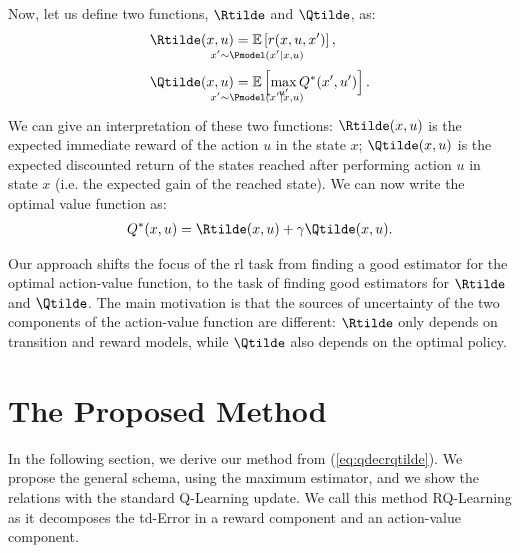 Now, let us define two functions, $\Rtilde$ and $\Qtilde$, as:
\begin{align}
 \Rtilde(x,u)&=\underset{\strut\mathclap{x'\sim \Pmodel(x'|x,u)}}{\mathbb{E}}\left[ r(x,u,x')\right], \nonumber\ \\
 \Qtilde(x,u)&=\underset{\strut\mathclap{x'\sim \Pmodel(x'|x,u)}}{\mathbb{E}}\left[\max_{u'} Q^*(x',u')\right].
 \label{eq:rqtilde}
\end{align}
We can give an interpretation of these two functions: $\Rtilde(x,u)$ is the expected immediate reward of the action $u$ in the state $x$; $\Qtilde(x,u)$ is the expected discounted return of the states reached after performing action $u$ in state $x$ (i.e. the expected gain of the reached state).
We can now write the optimal value function as:
\begin{align}
 Q^*(x,u)=\Rtilde(x,u)+\gamma\Qtilde(x,u).
 \label{eq:qdecrqtilde}
\end{align}

Our approach shifts the focus of the \gls{rl} task from finding a good estimator for the optimal action-value function, to the task of finding good estimators for $\Rtilde$ and $\Qtilde$. The main motivation is that the sources of uncertainty of the two components of the action-value function are different: $\Rtilde$ only depends on transition and reward models, while $\Qtilde$ also depends on the optimal policy.
\section{The Proposed Method}
In the following section, we derive our method from (\ref{eq:qdecrqtilde}). We propose the general schema, using the maximum estimator, and we show the relations with the standard Q-Learning update. We call this method RQ-Learning as it decomposes the \gls{td}-Error in a reward component and an action-value component.

